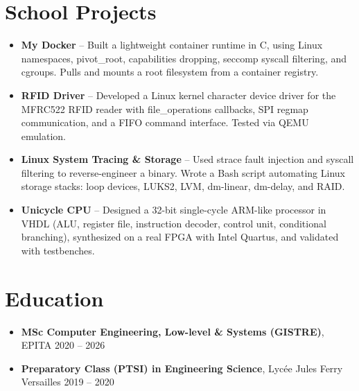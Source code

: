 \documentclass[9pt,a4paper]{article}
\begin{document}
\section*{School Projects}
\begin{tcolorbox}[mybox]
\begin{itemize}
\item \textbf{My Docker} -- Built a lightweight container runtime in C, using Linux namespaces, pivot\_root, capabilities dropping, seccomp syscall filtering, and cgroups. Pulls and mounts a root filesystem from a container registry.

\item \textbf{RFID Driver} -- Developed a Linux kernel character device driver for the MFRC522 RFID reader with file\_operations callbacks, SPI regmap communication, and a FIFO command interface. Tested via QEMU emulation.

\item \textbf{Linux System Tracing \& Storage} -- Used strace fault injection and syscall filtering to reverse-engineer a binary. Wrote a Bash script automating Linux storage stacks: loop devices, LUKS2, LVM, dm-linear, dm-delay, and RAID.

\item \textbf{Unicycle CPU} -- Designed a 32-bit single-cycle ARM-like processor in VHDL (ALU, register file, instruction decoder, control unit, conditional branching), synthesized on a real FPGA with Intel Quartus, and validated with testbenches.
\end{itemize}
\end{tcolorbox}


\section*{Education}
\begin{tcolorbox}[mybox]
\begin{itemize}
\item \textbf{MSc Computer Engineering, Low-level \& Systems (GISTRE)}, EPITA {\small{\hfill 2020 – 2026}}

\item \textbf{Preparatory Class (PTSI) in Engineering Science}, Lycée Jules Ferry Versailles {\small{\hfill 2019 – 2020}}
\end{itemize}
\end{tcolorbox}
\end{document}
